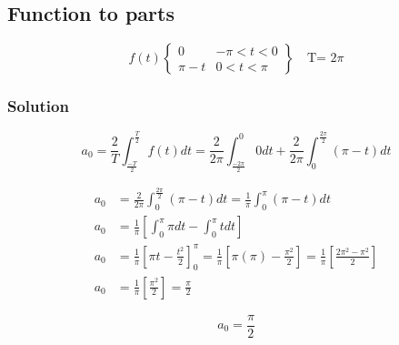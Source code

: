 \documentclass{article}
\begin{document}
\subsection{Function to parts}
\begin{equation}
    f(t)\begin{Bmatrix}
0 & -\pi< t < 0\\ 
\pi -t & 0 < t <\pi 
\end{Bmatrix}
\quad \text{T= 2$\pi$}
\end{equation}

\subsubsection{Solution}

\begin{equation}
    a_0=\frac{2}{T} \int_{\frac{-T}{2}}^{\frac{T}{2}}f(t)dt = \frac{2}{2 \pi} \int_{\frac{-2 \pi}{2}}^{0}0dt+ \frac{2}{2 \pi} \int_{0}^{\frac{2 \pi}{2}}(\pi - t)dt
\end{equation}

\begin{align*}
    a_0&=\frac{2}{2 \pi} \int_{0}^{\frac{2 \pi}{2}}(\pi - t)dt= \frac{1}{ \pi} \int_{0}^{\pi}(\pi - t)dt\\
    a_0&= \frac{1}{ \pi} \left [\int_{0}^{\pi}\pi dt -  \int_{0}^{\pi}t dt \right ]\\
    a_0&= \frac{1}{ \pi} \left [ \pi t -  \frac{t^2}{2} \right ]_{0}^{\pi}=\frac{1}{ \pi} \left [ \pi (\pi) -  \frac{\pi ^2}{2} \right ]= \frac{1}{ \pi} \left [  \frac{2 \pi^2 -\pi^2}{2} \right ]\\
    a_0&=\frac{1}{ \pi} \left [  \frac{\pi^2}{2} \right ]=\frac{\pi}{2}
\end{align*}

\begin{equation}
\boxed{ a_0=\frac{\pi}{2}}
\end{equation}
\end{document}
